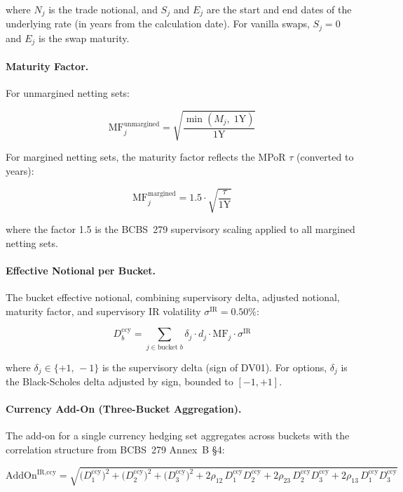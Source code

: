 \documentclass[11pt,a4paper]{article}
\begin{document}
where $N_j$ is the trade notional, and $S_j$ and $E_j$ are the start and end
dates of the underlying rate (in years from the calculation date). For vanilla
swaps, $S_j = 0$ and $E_j$ is the swap maturity.

\paragraph{Maturity Factor.}
For unmargined netting sets:

\begin{equation}
  \text{MF}_j^{\text{unmargined}} = \sqrt{\frac{\min(M_j,\; 1\text{Y})}{1\text{Y}}}
  \label{eq:mf_unmargined}
\end{equation}

For margined netting sets, the maturity factor reflects the MPoR $\tau$
(converted to years):

\begin{equation}
  \text{MF}_j^{\text{margined}} = 1.5 \cdot \sqrt{\frac{\tau}{1\text{Y}}}
  \label{eq:mf_margined}
\end{equation}

where the factor 1.5 is the BCBS~279 supervisory scaling applied to all
margined netting sets.

\paragraph{Effective Notional per Bucket.}
The bucket effective notional, combining supervisory delta, adjusted notional,
maturity factor, and supervisory IR volatility $\sigma^{\text{IR}} = 0.50\%$:

\begin{equation}
  D_b^{\text{ccy}} = \sum_{j \in \text{bucket }b}
    \delta_j \cdot d_j \cdot \text{MF}_j \cdot \sigma^{\text{IR}}
  \label{eq:bucket_notional}
\end{equation}

where $\delta_j \in \{+1,\, -1\}$ is the supervisory delta (sign of DV01).
For options, $\delta_j$ is the Black-Scholes delta adjusted by sign, bounded
to $[-1, +1]$.

\paragraph{Currency Add-On (Three-Bucket Aggregation).}
The add-on for a single currency hedging set aggregates across buckets with
the correlation structure from BCBS~279 Annex~B \S4:

\begin{equation}
  \text{AddOn}^{\text{IR,ccy}} = \sqrt{
    \bigl(D_1^{\text{ccy}}\bigr)^2
    + \bigl(D_2^{\text{ccy}}\bigr)^2
    + \bigl(D_3^{\text{ccy}}\bigr)^2
    + 2\rho_{12}\, D_1^{\text{ccy}} D_2^{\text{ccy}}
    + 2\rho_{23}\, D_2^{\text{ccy}} D_3^{\text{ccy}}
    + 2\rho_{13}\, D_1^{\text{ccy}} D_3^{\text{ccy}}
  }
  \label{eq:ir_addon_full}
\end{equation}
\end{document}

